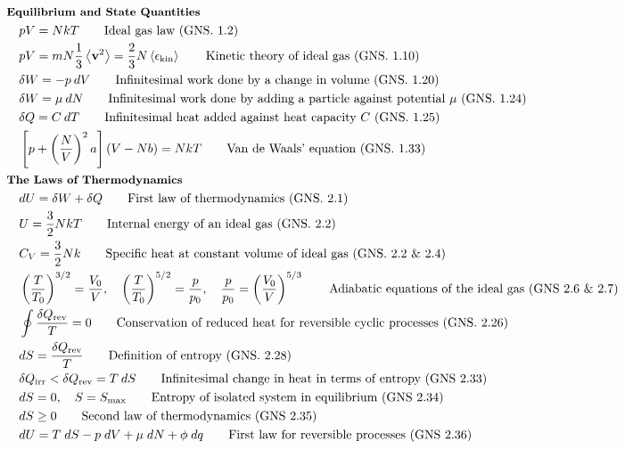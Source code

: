 \documentclass[10pt]{article}
\newcommand{\ve}[1]{\boldsymbol{\mathbf{#1}}}
\newcommand{\lrp}[1]{\left( #1 \right)}
\newcommand{\lrb}[1]{\left[ #1 \right]}
\begin{document}
\begin{multicols}{2}
	\tiny
	\setlength{\abovedisplayskip}{-25pt}
	\setlength{\belowdisplayskip}{0pt}
	\setlength{\abovedisplayshortskip}{0pt}
	\setlength{\belowdisplayshortskip}{0pt}
	\begin{align*}
	& \small \hspace{-10pt} \textbf{Equilibrium and State Quantities} \small \\
		& p V = NkT		\tag*{Ideal gas law (GNS. 1.2)} \\
		& p V = m N \frac{1}{3} \expval{\ve{v}^2} = \frac{2}{3} N \expval{\epsilon_{\text{kin}}}	\tag*{Kinetic theory of ideal gas (GNS. 1.10)} \\
		& \delta W = - p \: dV	\tag*{Infinitesimal work done by a change in volume (GNS. 1.20)} \\
		& \delta W = \mu \: dN	\tag*{Infinitesimal work done by adding a particle against potential $\mu$ (GNS. 1.24)} \\
		& \delta Q = C \: dT	\tag*{Infinitesimal heat added against heat capacity $C$ (GNS. 1.25)} \\
		& \lrb{p + \lrp{\frac{N}{V}}^2a}(V - Nb) = NkT	\tag*{Van de Waals' equation (GNS. 1.33)} \\
	& \small \hspace{-10pt} \textbf{The Laws of Thermodynamics} \small \\	
		& dU = \delta W + \delta Q	\tag*{First law of thermodynamics (GNS. 2.1)} \\
		& U = \frac{3}{2} N k T	\tag*{Internal energy of an ideal gas (GNS. 2.2)} \\
		& C_V = \frac{3}{2}	Nk	\tag*{Specific heat at constant volume of ideal gas (GNS. 2.2 \& 2.4)} \\
		& \lrp{\frac{T}{T_0}}^{3/2} = \frac{V_0}{V}, \quad \lrp{\frac{T}{T_0}}^{5/2} = \frac{p}{p_0}, \quad \frac{p}{p_0} = \lrp{\frac{V_0}{V}}^{5/3} \tag*{Adiabatic equations of the ideal gas (GNS 2.6 \& 2.7)} \\
		& \oint \frac{\delta Q_{\text{rev}}}{T} = 0		\tag*{Conservation of reduced heat for reversible cyclic processes (GNS. 2.26)} \\
		& dS =  \frac{\delta Q_{\text{rev}}}{T}	\tag*{Definition of entropy (GNS. 2.28)} \\
		& \delta Q_{\text{irr}} < \delta Q_{\text{rev}} = T \: dS	\tag*{Infinitesimal change in heat in terms of entropy (GNS 2.33)} \\
		& dS = 0, \quad S = S_{\text{max}}	\tag*{Entropy of isolated system in equilibrium (GNS 2.34)} \\
		& dS \geq 0	\tag*{Second law of thermodynamics (GNS 2.35)} \\
		& dU = T \; dS - p \; dV + \mu \; dN + \phi \; dq	\tag*{First law for reversible processes (GNS 2.36)} \\
	\end{align*} 
	\setlength{\abovedisplayskip}{-25pt}
	\setlength{\belowdisplayskip}{0pt}
	\setlength{\abovedisplayshortskip}{0pt}
	\setlength{\belowdisplayshortskip}{0pt}
	\begin{align*} 
	\end{align*}
\end{multicols}
 
\end{document}
